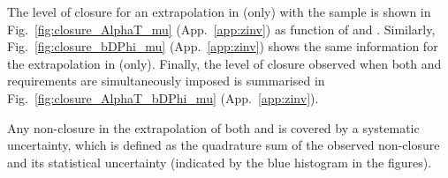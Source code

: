 The level of closure for an extrapolation in \alphat (only) with the
\mj sample is shown in Fig.~\ref{fig:closure_AlphaT_mu}
(App.~\ref{app:zinv}) as function of \scalht and \njet. Similarly,
Fig.~\ref{fig:closure_bDPhi_mu} (App.~\ref{app:zinv}) shows the same
information for the extrapolation in \bdphi (only). Finally, the level
of closure observed when both \alphat and \bdphi requirements are
simultaneously imposed is summarised in
Fig.~\ref{fig:closure_AlphaT_bDPhi_mu} (App.~\ref{app:zinv}).

Any non-closure in the extrapolation of both \alphat and \bdphi is
covered by a systematic uncertainty, which is defined as the
quadrature sum of the observed non-closure and its statistical
uncertainty (indicated by the blue histogram in the figures). 

